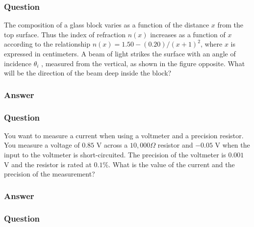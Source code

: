 \subsubsection{Question}
The composition of a glass block varies as a function of the distance $x$ from the top surface. Thus the index of refraction $n(x)$ increases as a function of $x$ according to the relationship $n(x) = 1.50 - (0.20) /(x +1)^2 $, where $x$ is expressed in centimeters. A beam of light strikes the surface with an angle of incidence $\theta_i$ , measured from the vertical, as shown in the figure opposite. What will be the direction of the beam deep inside the block?
\subsubsection{Answer}


\subsubsection{Question}
You want to measure a current when using a voltmeter and a precision resistor. You measure a voltage of $0.85$ V across a $10,000\Omega$ resistor and $-0.05$ V when the input to the voltmeter is short-circuited. The precision of the voltmeter is $0.001$ V and the resistor is rated at $0.1\%$. What is the value of the current and the precision of the measurement?
\subsubsection{Answer}


\subsubsection{Question}

